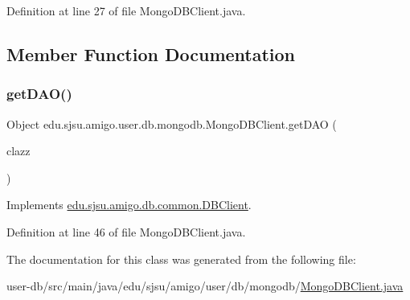 Definition at line 27 of file Mongo\+D\+B\+Client.\+java.



\subsection{Member Function Documentation}
\mbox{\label{classedu_1_1sjsu_1_1amigo_1_1user_1_1db_1_1mongodb_1_1_mongo_d_b_client_aed337080b1cdb29cdc02b10ba51bddc5}} 
\subsubsection{\texorpdfstring{get\+D\+A\+O()}{getDAO()}}
{\footnotesize\ttfamily Object edu.\+sjsu.\+amigo.\+user.\+db.\+mongodb.\+Mongo\+D\+B\+Client.\+get\+D\+AO (\begin{DoxyParamCaption}\item[{Class$<$? extends \hyperlink{interfaceedu_1_1sjsu_1_1amigo_1_1db_1_1common_1_1_base_d_a_o}{Base\+D\+AO} $>$}]{clazz }\end{DoxyParamCaption})}



Implements \hyperlink{interfaceedu_1_1sjsu_1_1amigo_1_1db_1_1common_1_1_d_b_client_a82ddc58c08fa294ceb762b9443937964}{edu.\+sjsu.\+amigo.\+db.\+common.\+D\+B\+Client}.



Definition at line 46 of file Mongo\+D\+B\+Client.\+java.



The documentation for this class was generated from the following file\+:\begin{DoxyCompactItemize}
\item 
user-\/db/src/main/java/edu/sjsu/amigo/user/db/mongodb/\hyperlink{_mongo_d_b_client_8java}{Mongo\+D\+B\+Client.\+java}\end{DoxyCompactItemize}
